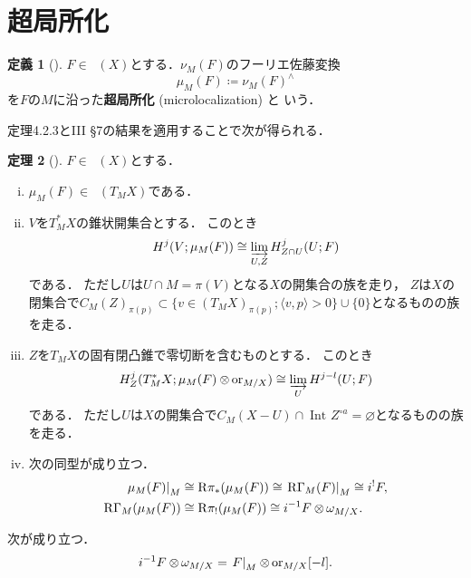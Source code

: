 \documentclass[uplatex,dvipdfmx,a4paper,10pt,draft]{jsarticle}
\theoremstyle{definition}
\newcommand{\rr}{\mathbf{R}}
\numberwithin{equation}{section}
\newcommand{\Dompb}{\mathop{\mathsf{D}^\mathrm{b}}\nolimits}
\newcommand{\RG}{\mathop{\mathrm{R}\hspace{-0pt}\Gamma}\nolimits}
\newcommand{\Rder}{\mathrm{R}}
\newcommand{\indlim}[1][]{\mathop{\varinjlim}\limits_{#1}}
\newcommand{\ori}{\mathord{\mathrm{or}}}
\newcommand{\tens}[1][]{\mathbin{\otimes_{\raise1.5ex\hbox to-.1em{}{#1}}}}
\newcommand{\mres}[2][]{{\left.{#1}\right\rvert}_{#2}}
\theoremstyle{mystyle}
\newtheorem{mythm}{定理}[section]
\newtheorem{mydfn}[mythm]{定義}
\newenvironment{thm}{\begin{thmbox}\begin{mythm}}{\end{mythm}\end{thmbox}}
\newenvironment{dfn}{\begin{dfnbox}\begin{mydfn}}{\end{mydfn}\end{dfnbox}}
\newcommand{\Dbcon}{\mathop{\mathsf{D}^{\mathrm{b}}_{\rr^+}}\nolimits}
\newcommand{\Int}[1][]{\mathop{\mathrm{Int}}\nolimits_{#1}}
\def\inner<#1>{\langle #1 \rangle}
\begin{document}
\section{超局所化{\cite[\S 4.3]{KS90}}}

\begin{dfn}[{\cite[Def 4.3.1]{KS90}}]
    \(F\in\Dompb(X)\)とする．\(\nu_{M}(F)\)のフーリエ佐藤変換
    \[
        \mu_{M}(F)
        \coloneqq 
        \nu_{M}(F)^{\wedge}
    \]
    を\(F\)の\(M\)に沿った\textbf{超局所化} (microlocalization) と
    いう．
\end{dfn}

定理4.2.3とIII \S7の結果を適用することで次が得られる．

\begin{thm}[{\cite[Thm 4.3.2]{KS90}}]
    \(F\in\Dompb(X)\)とする．
    \begin{enumerate}[(i)]
        \item \(\mu_{M}(F)\in\Dbcon(T_{M}X)\)である．
        \item \(V\)を\(T^{\ast}_{M}X\)の錐状開集合とする．
        このとき\[
            H^{j}(V;\mu_{M}(F))
            \cong
            \indlim[U,Z]H_{Z\cap U}^{j}(U;F)
        \]である．
        ただし\(U\)は\(
            U\cap M=\pi(V)
        \)となる\(X\)の開集合の族を走り，
        \(Z\)は\(X\)の閉集合で\(
            C_{M}(Z)_{\pi(p)}
            \subset 
            \{v\in (T_{M}X)_{\pi(p)};\inner<v,p>>0\}\cup\{0\}
        \)となるものの族を走る．
        \item \(Z\)を\(T_{M}X\)の固有閉凸錐で零切断を含むものとする．
        このとき\[
            H^{j}_{Z}(T^{\ast}_{M}X;\mu_{M}(F)\tens[]\ori_{M/X})
            \cong
            \indlim[U]H^{j-l}(U;F)
        \]である．
        ただし\(U\)は\(X\)の開集合で\(
            C_{M}(X-U)\cap\Int[]{Z^{\circ a}}=\varnothing
        \)となるものの族を走る．
        \item 次の同型が成り立つ．\begin{align*}
            \mres[\mu_{M}(F)]{M}
            &\cong \Rder{\pi}_{\ast}(\mu_{M}(F))
            \cong \mres[\RG_{M}(F)]{M}
            \cong i^{!}F,\\
            \RG_{M}(\mu_{M}(F))
            &\cong \Rder{\pi}_{!}(\mu_{M}(F))
            \cong i^{-1}F\tens[]\omega_{M/X}.
        \end{align*}
    \end{enumerate}
\end{thm}

次が成り立つ．
\[
    i^{-1}F\tens[]\omega_{M/X}
    =\mres[F]{M}\tens[]\ori_{M/X}[-l].
\]
\end{document}
